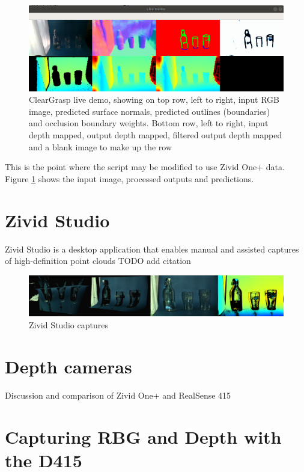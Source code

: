 \begin{figure}[h!]
\centering
\includegraphics[width=\textwidth]{Figures/ClearGraspLiveDemoForReport.png}
\caption{ClearGrasp live demo, showing on top row, left to right, input RGB image, predicted surface normals, predicted outlines (boundaries) and occlusion boundary weights. Bottom row, left to right, input depth mapped, output depth mapped, filtered output depth mapped and a blank image to make up the row}
\label{fig:ClearGraspLiveDemoForReport}
\end{figure}

This is the point where the script may be modified to use Zivid One+ data. Figure \ref{fig:ClearGraspLiveDemoForReport} shows the input image, processed outputs and predictions. 

\section{Zivid Studio}
Zivid Studio is a desktop application that enables manual and assisted captures of high-definition point clouds
TODO add citation

\begin{figure}[h!]
\centering
\includegraphics[width=\textwidth]{Figures/ZividStudio.png}
\caption{Zivid Studio captures}
\label{fig:ZividStudio}
\end{figure}

\section{Depth cameras}
Discussion and comparison of Zivid One+ and RealSense 415

\section{Capturing RBG and Depth with the D415}


